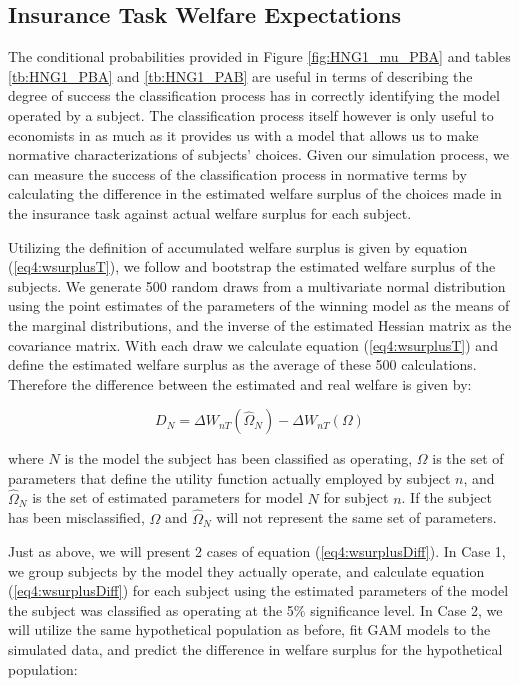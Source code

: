 \documentclass[../main.tex]{subfiles}
\begin{document}
\subsection{\texorpdfstring{\textcite{Harrison2016}}{Harrison and Ng (2016)} Insurance Task Welfare Expectations}

The conditional probabilities provided in Figure \ref{fig:HNG1_mu_PBA} and tables \ref{tb:HNG1_PBA} and \ref{tb:HNG1_PAB} are useful in terms of describing the degree of success the classification process has in correctly identifying the model operated by a subject.
The classification process itself however is only useful to economists in as much as it provides us with a model that allows us to make normative characterizations of subjects' choices.
Given our simulation process, we can measure the success of the classification process in normative terms by calculating the difference in the estimated welfare surplus of the choices made in the \textcite{Harrison2016} insurance task against actual welfare surplus for each subject.

Utilizing the definition of accumulated welfare surplus is given by equation (\ref{eq4:wsurplusT}), we follow \textcite[110-111]{Harrison2016} and bootstrap the estimated welfare surplus of the subjects.
We generate 500 random draws from a multivariate normal distribution using the point estimates of the parameters of the winning model as the means of the marginal distributions, and the inverse of the estimated Hessian matrix as the covariance matrix.
With each draw we calculate equation (\ref{eq4:wsurplusT}) and define the estimated welfare surplus as the average of these 500 calculations.
Therefore the difference between the estimated and real welfare is given by:

\begin{equation}
	\label{eq4:wsurplusDiff}
	D_N = \Delta W_{nT}(\hat{\Omega}_N) - \Delta W_{nT}(\Omega)
\end{equation}

\noindent where $N$ is the model the subject has been classified as operating, $\Omega$ is the set of parameters that define the utility function actually employed by subject $n$, and $\hat{\Omega}_N$ is the set of estimated parameters for model $N$ for subject $n$.
If the subject has been misclassified, $\Omega$ and $\hat{\Omega}_N$ will not represent the same set of parameters.

Just as above, we will present 2 cases of equation (\ref{eq4:wsurplusDiff}).
In Case 1, we group subjects by the model they actually operate, and calculate equation (\ref{eq4:wsurplusDiff}) for each subject using the estimated parameters of the model the subject was classified as operating at the 5\% significance level.
In Case 2, we will utilize the same hypothetical population as before, fit GAM models to the simulated data, and predict the difference in welfare surplus for the hypothetical population:
\end{document}
